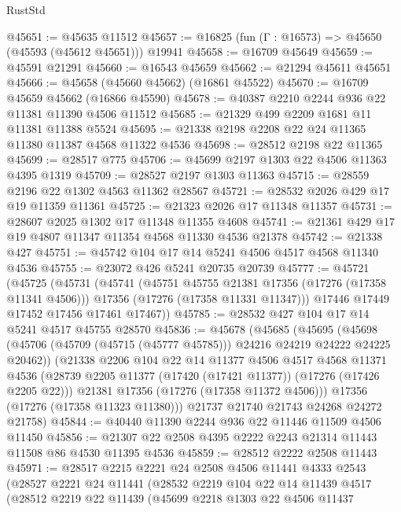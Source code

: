 \begin{lexlean}{RustStd}
\begin{coremodule}
@45651 := @45635 @11512
@45657 := @16825 (fun (Γ : @16573) => @45650 (@45593 (@45612 @45651))) @19941
@45658 := @16709 @45649
@45659 := @45591 @21291
@45660 := @16543 @45659
@45662 := @21294 @45611 @45651
@45666 := @45658 (@45660 @45662) (@16861 @45522)
@45670 := @16709 @45659 @45662 (@16866 @45590)
@45678 := @40387 @2210 @2244 @936 @22 @11381 @11390 @4506 @11512
@45685 := @21329 @499 @2209 @1681 @11 @11381 @11388 @5524
@45695 := @21338 @2198 @2208 @22 @24 @11365 @11380 @11387 @4568 @11322 @4536
@45698 := @28512 @2198 @22 @11365
@45699 := @28517 @775
@45706 := @45699 @2197 @1303 @22 @4506 @11363 @4395 @1319
@45709 := @28527 @2197 @1303 @11363
@45715 := @28559 @2196 @22 @1302 @4563 @11362 @28567
@45721 := @28532 @2026 @429 @17 @19 @11359 @11361
@45725 := @21323 @2026 @17 @11348 @11357
@45731 := @28607 @2025 @1302 @17 @11348 @11355 @4608
@45741 := @21361 @429 @17 @19 @4807 @11347 @11354 @4568 @11330 @4536 @21378
@45742 := @21338 @427
@45751 := @45742 @104 @17 @14 @5241 @4506 @4517 @4568 @11340 @4536
@45755 := @23072 @426 @5241 @20735 @20739
@45777 := @45721
    (@45725
      (@45731
        (@45741
          (@45751 @45755 @21381 @17356 (@17276 (@17358 @11341 @4506)))
          @17356
          (@17276 (@17358 @11331 @11347)))
        @17446
        @17449
        @17452
        @17456
        @17461
        @17467))
@45785 := @28532 @427 @104 @17 @14 @5241 @4517 @45755 @28570
@45836 := @45678
    (@45685
      (@45695
        (@45698 (@45706 (@45709 (@45715 (@45777 @45785))) @24216 @24219 @24222 @24225 @20462))
        (@21338
          @2206
          @104
          @22
          @14
          @11377
          @4506
          @4517
          @4568
          @11371
          @4536
          (@28739 @2205 @11377 (@17420 (@17421 @11377)) (@17276 (@17426 @2205 @22)))
          @21381
          @17356
          (@17276 (@17358 @11372 @4506)))
        @17356
        (@17276 (@17358 @11323 @11380)))
      @21737
      @21740
      @21743
      @24268
      @24272
      @21758)
@45844 := @40440 @11390 @2244 @936 @22 @11446 @11509 @4506 @11450
@45856 := @21307 @22 @2508 @4395 @2222 @2243 @21314 @11443 @11508 @86 @4530 @11395 @4536
@45859 := @28512 @2222 @2508 @11443
@45971 := @28517
    @2215
    @2221
    @24
    @2508
    @4506
    @11441
    @4333
    @2543
    (@28527
      @2221
      @24
      @11441
      (@28532
        @2219
        @104
        @22
        @14
        @11439
        @4517
        (@28512
          @2219
          @22
          @11439
          (@45699
            @2218
            @1303
            @22
            @4506
            @11437

\end{coremodule}
\end{lexlean}
